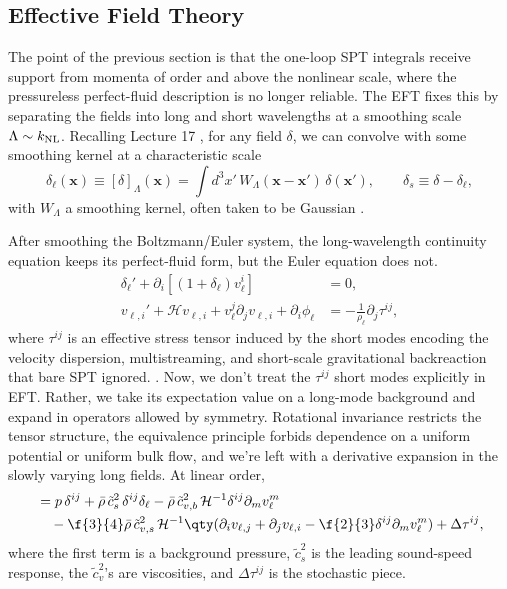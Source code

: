 \subsection{Effective Field Theory}
\label{subsec:eft}
The point of the previous section is that the one-loop SPT integrals receive support from momenta of order and above the nonlinear scale, where the pressureless perfect-fluid description is no longer reliable. The EFT fixes this by separating the fields into long and
short wavelengths at a smoothing scale $ \Lambda\sim k_{\rm NL} $. Recalling Lecture 17 \citep{Dvorkin2026}, for any field $\delta $, we can convolve with some smoothing kernel at a characteristic scale 
\begin{equation}
    \delta_\ell(\mathbf{x}) \equiv [\delta]_\Lambda(\mathbf{x})
    = \int d^3x'\,W_\Lambda(\mathbf{x}-\mathbf{x}')\,\delta(\mathbf{x}'),
    \qquad
    \delta_s \equiv \delta - \delta_\ell,
\end{equation}
with $ W_\Lambda $ a smoothing kernel, often taken to be Gaussian
\citep{CarrascoEtAl2012,Senatore_EFTofLSS_lectures}.

After smoothing the
Boltzmann/Euler system, the long-wavelength continuity equation keeps its perfect-fluid form, but the Euler equation does not. 
\begin{align}
    \delta_\ell' + \partial_i\!\left[(1+\delta_\ell)v_\ell^i\right] &= 0, \\
    v_{\ell,i}' + \mathcal{H} v_{\ell,i}
    + v_\ell^j \partial_j v_{\ell,i}
    + \partial_i \phi_\ell
    &= -\frac{1}{\rho_\ell}\partial_j\tau^{ij},
\end{align}
where $ \tau^{ij} $ is an effective stress tensor induced by the short modes encoding the 
velocity dispersion, multistreaming, and short-scale gravitational 
backreaction that bare SPT ignored.
\citep{CarrascoEtAl2012,Senatore_EFTofLSS_lectures,Baldauf2020}.
Now, we don't treat the $ \tau^{ij} $  short modes explicitly in EFT. Rather, we take its expectation value on a long-mode background and 
expand in operators allowed by symmetry. Rotational invariance restricts the
tensor structure, the equivalence principle forbids dependence on a uniform potential or
uniform bulk flow, and we're left with a derivative expansion in the slowly varying long
fields. At linear order,
\begin{align}
    [\tau^{ij}]
    &=
    p\,\delta^{ij}
    + \bar\rho\,\tilde c_s^2\,\delta^{ij}\delta_\ell
    - \bar\rho\,\tilde c_{v,b}^2\,\mathcal{H}^{-1}\delta^{ij}\partial_m v_\ell^m\nonumber\\
    &\quad - \f{3}{4}\bar\rho\,\tilde c_{v,s}^2\,\mathcal{H}^{-1}
    \qty(
        \partial_i v_{\ell,j}+\partial_j v_{\ell,i}
        - \f{2}{3}\delta^{ij}\partial_m v_\ell^m
    )
    + \Delta\tau^{ij},
\end{align}
where the first term is a background pressure,  $ \tilde c_s^2 $  is the leading sound-speed response, the $ \tilde c_v^2 $'s are viscosities, and $ \Delta\tau^{ij} $ is the
stochastic piece. 

